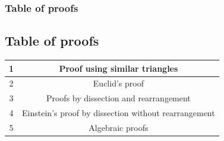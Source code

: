 \documentclass{beamer}
\begin{document}
\begin{frame}
\frametitle{Table of proofs}
\subsection{Table of proofs}
\begin{center}
 \begin{tabular}{||c | c||} 
\hline
 1 & Proof using similar triangles \\ 
 \hline
 2 & Euclid's proof \\
 \hline
 3 & Proofs by dissection and rearrangement \\
 \hline
 4 & Einstein's proof by dissection without rearrangement \\
 \hline
 5 & Algebraic proofs \\ [1ex] 
 \hline
\end{tabular}
\newline
\end{center}
\end{frame}
\end{document}
